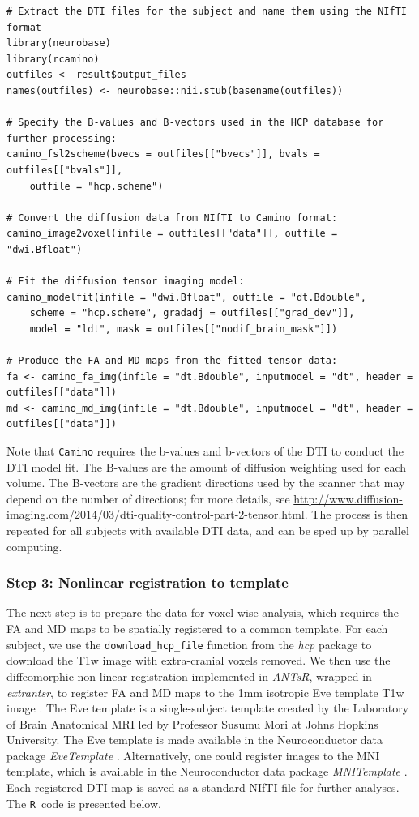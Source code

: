 \documentclass[]{elsarticle} %
\newcommand{\code}[1]{\texttt{#1}}
\newcommand{\pkg}[1]{\emph{#1}}
\newcommand{\rlang}{\texttt{R}}
\begin{document}
\color{blue}
\begin{verbatim}
# Extract the DTI files for the subject and name them using the NIfTI format
library(neurobase)
library(rcamino)
outfiles <- result$output_files
names(outfiles) <- neurobase::nii.stub(basename(outfiles))

# Specify the B-values and B-vectors used in the HCP database for further processing:
camino_fsl2scheme(bvecs = outfiles[["bvecs"]], bvals = outfiles[["bvals"]],
    outfile = "hcp.scheme")

# Convert the diffusion data from NIfTI to Camino format:
camino_image2voxel(infile = outfiles[["data"]], outfile = "dwi.Bfloat")

# Fit the diffusion tensor imaging model:
camino_modelfit(infile = "dwi.Bfloat", outfile = "dt.Bdouble", 
    scheme = "hcp.scheme", gradadj = outfiles[["grad_dev"]],
    model = "ldt", mask = outfiles[["nodif_brain_mask"]])

# Produce the FA and MD maps from the fitted tensor data:
fa <- camino_fa_img(infile = "dt.Bdouble", inputmodel = "dt", header = outfiles[["data"]])
md <- camino_md_img(infile = "dt.Bdouble", inputmodel = "dt", header = outfiles[["data"]])
\end{verbatim}
\color{black}
Note that \texttt{Camino} requires the b-values and b-vectors of the DTI to conduct the DTI model fit. The B-values are the amount of diffusion weighting used for each volume. The B-vectors are the gradient directions used by the scanner that may depend on the number of directions; for more details, see \url{http://www.diffusion-imaging.com/2014/03/dti-quality-control-part-2-tensor.html}. The process is then repeated for all subjects with available DTI data, and can be sped up by parallel computing.

\subsubsection{Step 3: Nonlinear registration to template} 
The next step is to prepare the data for voxel-wise analysis, which requires the FA and MD maps to be spatially registered to a common template. For each subject, we use the \code{download\_hcp\_file} function from the \pkg{hcp} package to download the T1w image with extra-cranial voxels removed. We then use the diffeomorphic non-linear registration implemented in \pkg{ANTsR}, wrapped in \pkg{extrantsr}, to register FA and MD maps to the 1mm isotropic Eve template T1w image \citep{eve}. The Eve template is a single-subject template created by the Laboratory of Brain Anatomical MRI led by Professor Susumu Mori at Johns Hopkins University. The Eve template is made available in the Neuroconductor data package \pkg{EveTemplate} \cite{eve, MNITemplate}. Alternatively, one could register  images to the MNI template, which is available in the Neuroconductor data package \pkg{MNITemplate} \cite{mni,MNITemplate}.   Each registered DTI map is saved as a standard NIfTI file for further analyses. The \rlang~code is presented below.
\end{document}
